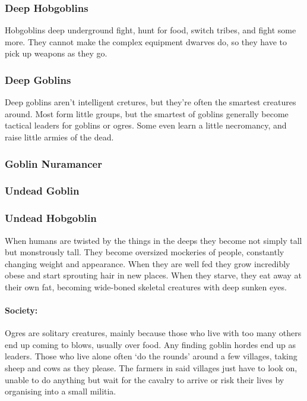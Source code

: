 \subsubsection{Deep Hobgoblins}\label{deep_hobgoblin}

Hobgoblins deep underground fight, hunt for food, switch tribes, and fight some more.  They cannot make the complex equipment dwarves do, so they have to pick up weapons as they go.

\deephobgoblin

\subsubsection{Deep Goblins}\label{deep_goblin}

Deep goblins aren't intelligent cretures, but they're often the smartest creatures around.  Most form little groups, but the smartest of goblins generally become tactical leaders for goblins or ogres.  Some even learn a little necromancy, and raise little armies of the dead.

\deepgoblin

\subsubsection{Goblin Nuramancer}
\goblinnuramancer

\subsubsection{Undead Goblin}

\undeadgoblin

\subsubsection{Undead Hobgoblin}

\undeadhobgoblin


\label{ogre}
\ogre


When humans are twisted by the things in the deeps they become not simply tall but monstrously tall.  They become oversized mockeries of people, constantly changing weight and appearance.  When they are well fed they grow incredibly obese and start sprouting hair in new places.  When they starve, they eat away at their own fat, becoming wide-boned skeletal creatures with deep sunken eyes.

\paragraph{Society:} Ogres are solitary creatures, mainly because those who live with too many others end up coming to blows, usually over food.  Any finding goblin hordes end up as leaders.  Those who live alone often `do the rounds' around a few villages, taking sheep and cows as they please.  The farmers in said villages just have to look on, unable to do anything but wait for the cavalry to arrive or risk their lives by organising into a small militia.

